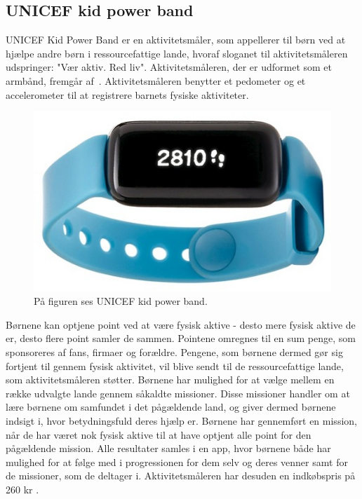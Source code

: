 \subsection{UNICEF kid power band}
UNICEF Kid Power Band er en aktivitetsmåler, som appellerer til børn ved at hjælpe andre børn i ressourcefattige lande, hvoraf sloganet til aktivitetsmåleren udspringer: "Vær aktiv. Red liv". \newline
Aktivitetsmåleren, der er udformet som et armbånd, fremgår af~. Aktivitetsmåleren benytter et pedometer og et accelerometer til at registrere barnets fysiske aktiviteter. \citep{PowerAbout2015,PowerManual2015}

\begin{figure}[H]
	\centering
	\includegraphics[scale=0.55]{figures/aProblemanalyse/unicef.png}
	\caption{På figuren ses UNICEF kid power band. \cite{Unicef2016}}
	\label{fig:unicef}
\end{figure}
Børnene kan optjene point ved at være fysisk aktive - desto mere fysisk aktive de er, desto flere point samler de sammen. Pointene omregnes til en sum penge, som sponsoreres af fans, firmaer og forældre. Pengene, som børnene dermed gør sig fortjent til gennem fysisk aktivitet, vil blive sendt til de ressourcefattige lande, som aktivitetsmåleren støtter. \newline
Børnene har mulighed for at vælge mellem en række udvalgte lande gennem såkaldte missioner. Disse missioner handler om at lære børnene om samfundet i det pågældende land, og giver dermed børnene indsigt i, hvor betydningsfuld deres hjælp er. Børnene har gennemført en mission, når de har været nok fysisk aktive til at have optjent alle point for den pågældende mission. \newline
Alle resultater samles i en app, hvor børnene både har mulighed for at følge med i progressionen for dem selv og deres venner samt for de missioner, som de deltager i. \citep{PowerAbout2015, PowerManuel2015} Aktivitetsmåleren har desuden en indkøbspris på 260 kr \citep{PowerAbout2015}. 

